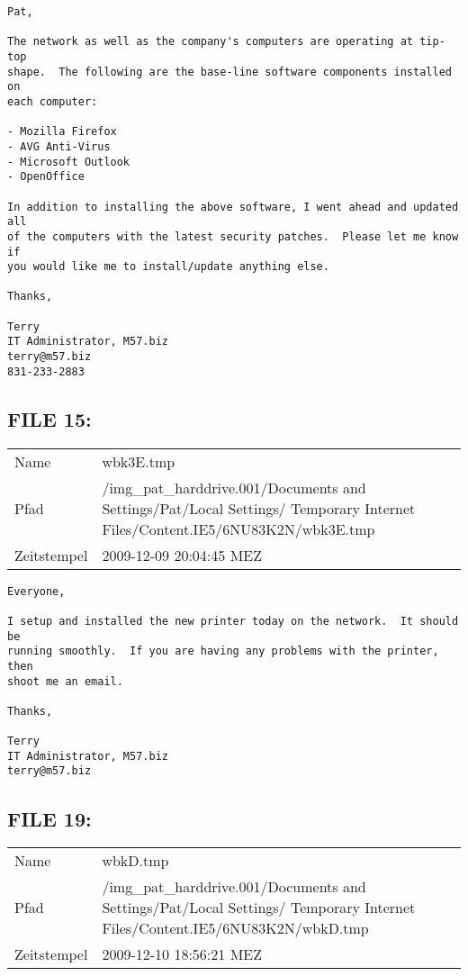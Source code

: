 \begin{lstlisting}
Pat,

The network as well as the company's computers are operating at tip-top 
shape.  The following are the base-line software components installed on 
each computer:

- Mozilla Firefox
- AVG Anti-Virus
- Microsoft Outlook
- OpenOffice

In addition to installing the above software, I went ahead and updated all 
of the computers with the latest security patches.  Please let me know if 
you would like me to install/update anything else.

Thanks,

Terry
IT Administrator, M57.biz
terry@m57.biz
831-233-2883
\end{lstlisting}

\subsection{FILE 15:}

\begin{table}[htb]
	\begin{tabular}{p{2cm} p{13.5cm}}
		Name & wbk3E.tmp\\
		Pfad & /img_pat_harddrive.001/Documents and Settings/Pat/Local Settings/ Temporary Internet Files/Content.IE5/6NU83K2N/wbk3E.tmp\\
		Zeitstempel & 2009-12-09 20:04:45 MEZ
	\end{tabular}
\end{table}	

\begin{lstlisting}
Everyone,

I setup and installed the new printer today on the network.  It should be 
running smoothly.  If you are having any problems with the printer, then 
shoot me an email.

Thanks,

Terry
IT Administrator, M57.biz
terry@m57.biz
\end{lstlisting}	

\subsection{FILE 19:}	

\begin{table}[htb]
	\begin{tabular}{p{2cm} p{13.5cm}}
		Name & wbkD.tmp\\
		Pfad & /img_pat_harddrive.001/Documents and Settings/Pat/Local Settings/ Temporary Internet Files/Content.IE5/6NU83K2N/wbkD.tmp\\
		Zeitstempel & 2009-12-10 18:56:21 MEZ
	\end{tabular}
\end{table}	

